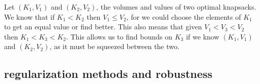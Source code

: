 \documentclass{article} %
\begin{document}
Let $(K_1, V_1)$ and $(K_2, V_2)$, the volumes and values of two optimal knapsacks. We know that if $K_1 < K_2$ then $V_1 \leq V_2$, for we could choose the elements of $K_1$ to get an equal value or find better. This also means that given $V_1 < V_3 < V_2$ then $K_1 < K_3 < K_2$. This allows us to find bounds on $K_3$ if we know $(K_1, V_1)$ and $(K_2, V_2)$, as it must be squeezed between the two.

%
%
%
%
%
%

\newpage
\subsection{regularization methods and robustness}
\end{document}
